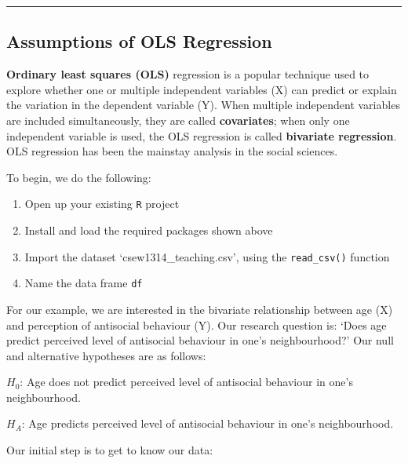 \documentclass[
]{book}
\newenvironment{Shaded}{\begin{snugshade}}{\end{snugshade}}
\newcommand{\CommentTok}[1]{\textcolor[rgb]{0.56,0.35,0.01}{\textit{#1}}}
\newcommand{\FunctionTok}[1]{\textcolor[rgb]{0.00,0.00,0.00}{#1}}
\newcommand{\NormalTok}[1]{#1}
\newcommand{\SpecialCharTok}[1]{\textcolor[rgb]{0.00,0.00,0.00}{#1}}
\begin{document}
\begin{center}\rule{0.5\linewidth}{0.5pt}\end{center}

\hypertarget{assumptions-of-ols-regression}{%
\subsection{Assumptions of OLS Regression}\label{assumptions-of-ols-regression}}

\textbf{Ordinary least squares (OLS)} regression is a popular technique used to explore whether one or multiple independent variables (X) can predict or explain the variation in the dependent variable (Y). When multiple independent variables are included simultaneously, they are called \textbf{covariates}; when only one independent variable is used, the OLS regression is called \textbf{bivariate regression}. OLS regression has been the mainstay analysis in the social sciences.

To begin, we do the following:

\begin{enumerate}
\def\labelenumi{\arabic{enumi}.}
\item
  Open up your existing \texttt{R} project
\item
  Install and load the required packages shown above
\item
  Import the dataset `csew1314\_teaching.csv', using the \texttt{read\_csv()} function
\item
  Name the data frame \texttt{df}
\end{enumerate}

For our example, we are interested in the bivariate relationship between age (X) and perception of antisocial behaviour (Y). Our research question is: `Does age predict perceived level of antisocial behaviour in one's neighbourhood?' Our null and alternative hypotheses are as follows:

\(H_0\): Age does not predict perceived level of antisocial behaviour in one's neighbourhood.

\(H_A\): Age predicts perceived level of antisocial behaviour in one's neighbourhood.

Our initial step is to get to know our data:

\begin{Shaded}
\end{Shaded}
\end{document}
